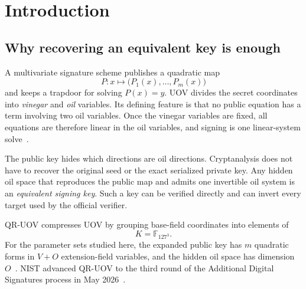 \documentclass[11pt,a4paper]{article}
\theoremstyle{definition}
\theoremstyle{remark}
\newcommand{\F}{\mathbb F}
\newcommand{\QRUOV}{\textsf{QR-UOV}}
\begin{document}
\begin{abstract}
The algebraic recovery and forgery claims are exact.  The key-density statements are exact in the stated public-random and ideal-primitive models.  The normalized asymptotic exponents lie below the three Round-2 category targets, with the most robust margins at Levels III and V.  These are not measured gate counts, and the direct degree-$2^V$ representations require enormous memory.  The paper therefore establishes a structural universal-forgery route and a concrete parameter-review obligation, while leaving implementation-level cost as the main unresolved question.
\end{abstract}

\section{Introduction}\label{sec:intro}

\subsection*{Why recovering an equivalent key is enough}
A multivariate signature scheme publishes a quadratic map
\[
P: x\longmapsto \bigl(P_1(x),\ldots,P_m(x)\bigr)
\]
and keeps a trapdoor for solving $P(x)=y$.  UOV divides the secret coordinates into \emph{vinegar} and \emph{oil} variables.  Its defining feature is that no public equation has a term involving two oil variables.  Once the vinegar variables are fixed, all equations are therefore linear in the oil variables, and signing is one linear-system solve~\cite{KPG1999}.

The public key hides which directions are oil directions.  Cryptanalysis does not have to recover the original seed or the exact serialized private key.  Any hidden oil space that reproduces the public map and admits one invertible oil system is an \emph{equivalent signing key}.  Such a key can be verified directly and can invert every target used by the official verifier.

\QRUOV{} compresses UOV by grouping base-field coordinates into elements of
\[
K=\F_{127^3}.
\]
For the parameter sets studied here, the expanded public key has $m$ quadratic forms in $V+O$ extension-field variables, and the hidden oil space has dimension $O$~\cite{QRUOV2021,QRUOVSpec}.  NIST advanced \QRUOV{} to the third round of the Additional Digital Signatures process in May 2026~\cite{NISTRound3,NISTIR8610}.
\end{document}
